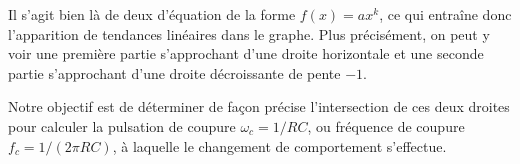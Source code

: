 Il s'agit bien là de deux d'équation de la forme $f(x) = ax^k$,
ce qui entraîne donc l'apparition de tendances linéaires dans le graphe.
Plus précisément, on peut y voir
une première partie s'approchant d'une droite horizontale et
une seconde partie s'approchant d'une droite décroissante
de pente $-1$.

Notre objectif est de déterminer de façon précise
l'intersection de ces deux droites
pour calculer la pulsation de coupure $\omega_c=1/RC$,
ou fréquence de coupure $f_c=1/(2\pi RC)$,
à laquelle le changement de comportement s'effectue.
